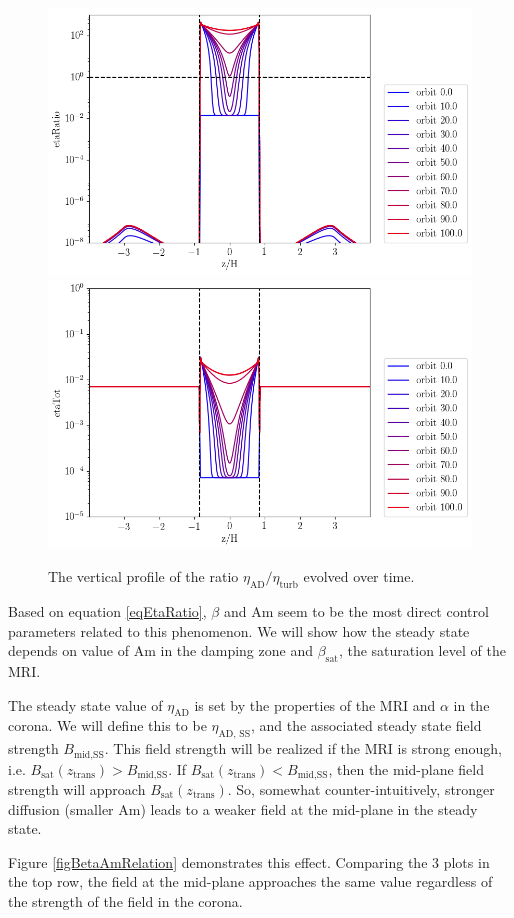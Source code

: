 \begin{figure}[p]
\centering
\includegraphics[width=0.49\columnwidth]{figs/figsChapter5/fiducialForPaper/withAD/etaRatio.png}
\includegraphics[width=0.49\columnwidth]{figs/figsChapter5/fiducialForPaper/withAD/etaTot.png}
\caption{The vertical profile of the ratio $\eta_\text{AD}/\eta_\text{turb}$ evolved over time.}
\label{figEtaRatio}
\end{figure}

Based on equation \ref{eqEtaRatio}, $\beta$ and Am seem to be the most direct control parameters related to this phenomenon.  We will show how the steady state depends on value of Am in the damping zone and $\beta_{\text{sat}}$, the saturation level of the MRI.

The steady state value of $\eta_{\text{AD}}$ is set by the properties of the MRI and $\alpha$ in the corona.  We will define this to be $\eta_{\text{AD, SS}}$, and the associated steady state field strength $B_{\text{mid,SS}}$.  This field strength will be realized if the MRI is strong enough, i.e. $B_{\text{sat}}(z_\text{trans}) > B_{\text{mid,SS}}$.  If $B_{\text{sat}}(z_\text{trans}) < B_{\text{mid,SS}}$, then the mid-plane field strength will approach $B_{\text{sat}}(z_\text{trans})$.  So, somewhat counter-intuitively, stronger diffusion (smaller Am) leads to a weaker field at the mid-plane in the steady state.  

Figure \ref{figBetaAmRelation} demonstrates this effect.  Comparing the 3 plots in the top row, the field at the mid-plane approaches the same value regardless of the strength of the field in the corona.  




